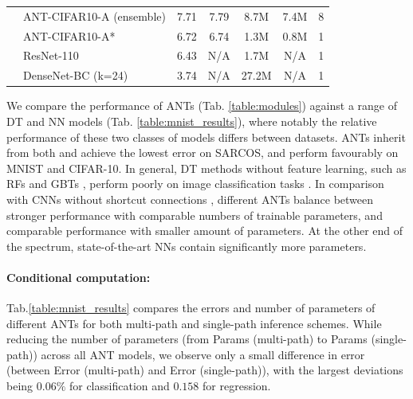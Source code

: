 \begin{table}[ht!]
\begin{tabular}{|c|l|cc|cc|c|}
		&\cellcolor{gray!10}ANT-CIFAR10-A (ensemble) & \cellcolor{gray!10}7.71 & \cellcolor{gray!10}  7.79 &\cellcolor{gray!10}8.7M&\cellcolor{gray!10}7.4M & \cellcolor{gray!10}8\\
		&\cellcolor{gray!10}ANT-CIFAR10-A* & \cellcolor{gray!10}6.72 & \cellcolor{gray!10} 6.74 &\cellcolor{gray!10}1.3M&\cellcolor{gray!10}0.8M & \cellcolor{gray!10}1\\
		& ResNet-110 \cite{he2016deep} & 6.43 & N/A & 1.7M  &N/A &1 \\
		& DenseNet-BC (k=24) \cite{huang2017densely} & 3.74 & N/A & 27.2M  &N/A &1 \\
		\hline
	\end{tabular}
\end{table}

We compare the performance of ANTs (Tab. \ref{table:modules}) against a range of DT and NN models (Tab. \ref{table:mnist_results}), where notably the relative performance of these two classes of models differs between datasets. ANTs inherit from both and achieve the lowest error on SARCOS, and perform favourably on MNIST and CIFAR-10. In general, DT methods without feature learning, such as RFs \cite{breiman2001random,zhou2017deepft} and GBTs \cite{ponomareva2017compact}, perform poorly on image classification tasks \cite{krizhevsky2009learning}. In comparison with CNNs without shortcut connections \cite{lecun1998gradient,goodfellow2013maxout,lin2013network,springenberg2014striving}, different ANTs balance between stronger performance with comparable numbers of trainable parameters, and comparable performance with smaller amount of parameters. At the other end of the spectrum, state-of-the-art NNs \cite{sabour2017dynamic,huang2017densely} contain significantly more parameters.

\paragraph{Conditional computation:} Tab.\ref{table:mnist_results} compares the errors and number of parameters of different ANTs for both multi-path and single-path inference schemes. While reducing the number of parameters (from Params (multi-path) to Params (single-path)) across all ANT models, we observe only a small difference in error (between Error (multi-path) and Error (single-path)), with the largest deviations being $0.06\%$ for classification and $0.158$ for regression. 

